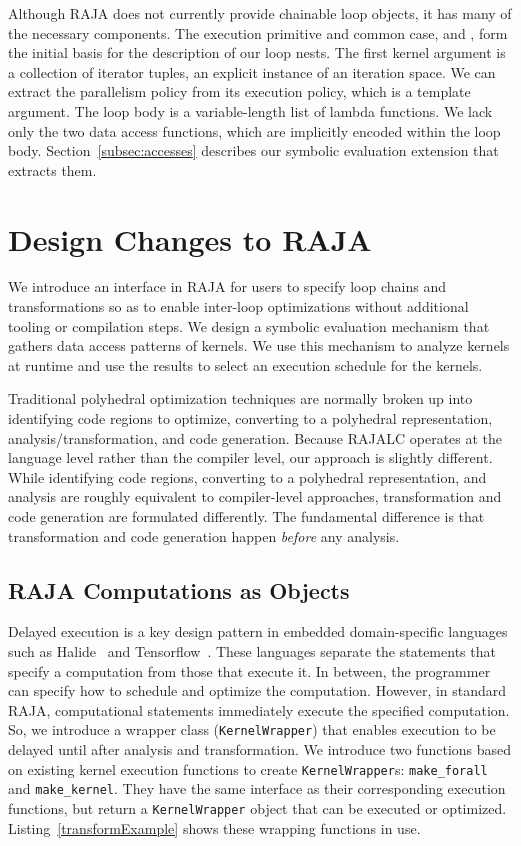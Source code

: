Although RAJA does not currently provide chainable loop objects, it has many
of the necessary components.
The execution primitive and common case,  and  , form
the initial basis for the description of our loop nests.
The first kernel argument is a collection of iterator tuples, an explicit
instance of an iteration space.
We can extract the parallelism policy from its execution policy, which is a
template argument.
The loop body is a variable-length list of lambda functions.
We lack only the two data access functions, which are implicitly encoded
within the loop body.
Section~\ref{subsec:accesses} describes our symbolic evaluation extension
that extracts them.

\section{Design Changes to RAJA}

We introduce an interface in RAJA for users to specify loop chains and transformations
so as to enable inter-loop optimizations without additional tooling or compilation steps.
We design a symbolic evaluation mechanism that gathers data access patterns of
kernels.
We use this mechanism to analyze kernels at runtime and use the results to select an execution schedule for the kernels.

Traditional polyhedral optimization techniques are normally broken up into identifying code regions to optimize, converting to a polyhedral representation, analysis/transformation, and code generation. 
Because RAJALC operates at the language level rather than the compiler level, our approach is slightly different. While identifying code regions, converting to a polyhedral representation, and analysis are roughly equivalent to compiler-level approaches, transformation and code generation are formulated differently. 
The fundamental difference is that transformation and code generation happen \textit{before} any analysis.

\subsection{RAJA Computations as Objects}

Delayed execution is a key design pattern in %
embedded domain-specific languages such as
Halide~\cite{Ragan-Kelley2013} and Tensorflow~\cite{tensorflow}.
These languages separate the statements that specify a computation from
those that execute it.
In between, the programmer can specify how to schedule and optimize the computation.
However, in standard RAJA, computational  statements immediately execute the specified computation.
So, we introduce a wrapper class (\verb.KernelWrapper.) that enables execution
to be delayed until after analysis and transformation.
We introduce two functions based on existing kernel execution functions to
create \verb.KernelWrapper.s: \verb.make_forall. and \verb.make_kernel..
They have the same interface as their corresponding execution functions, but
return a \verb.KernelWrapper. object that can be executed or optimized.
Listing~\ref{transformExample} shows these wrapping functions in use. 

